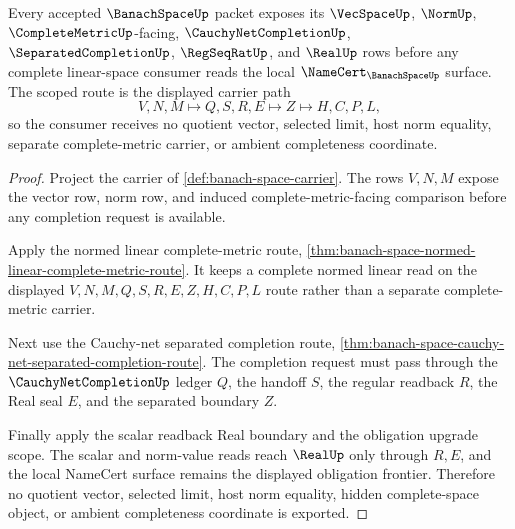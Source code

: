 \begin{theorem}
\label{thm:banach-space-scoped-completion-route}
Every accepted $\BanachSpaceUp$ packet exposes its $\VecSpaceUp$, $\NormUp$, $\CompleteMetricUp$-facing, $\CauchyNetCompletionUp$, $\SeparatedCompletionUp$, $\RegSeqRatUp$, and $\RealUp$ rows before any complete linear-space consumer reads the local $\NameCert_{\BanachSpaceUp}$ surface. The scoped route is the displayed carrier path
$$
V,N,M \longmapsto Q,S,R,E \longmapsto Z \longmapsto H,C,P,L ,
$$
so the consumer receives no quotient vector, selected limit, host norm equality, separate complete-metric carrier, or ambient completeness coordinate.
\end{theorem}
\begin{proof}
Project the carrier of \autoref{def:banach-space-carrier}. The rows $V,N,M$ expose the vector row, norm row, and induced complete-metric-facing comparison before any completion request is available.

Apply the normed linear complete-metric route, \autoref{thm:banach-space-normed-linear-complete-metric-route}. It keeps a complete normed linear read on the displayed $V,N,M,Q,S,R,E,Z,H,C,P,L$ route rather than a separate complete-metric carrier.

Next use the Cauchy-net separated completion route, \autoref{thm:banach-space-cauchy-net-separated-completion-route}. The completion request must pass through the $\CauchyNetCompletionUp$ ledger $Q$, the handoff $S$, the regular readback $R$, the Real seal $E$, and the separated boundary $Z$.

Finally apply the scalar readback Real boundary and the obligation upgrade scope. The scalar and norm-value reads reach $\RealUp$ only through $R,E$, and the local NameCert surface remains the displayed obligation frontier. Therefore no quotient vector, selected limit, host norm equality, hidden complete-space object, or ambient completeness coordinate is exported.
\end{proof}

